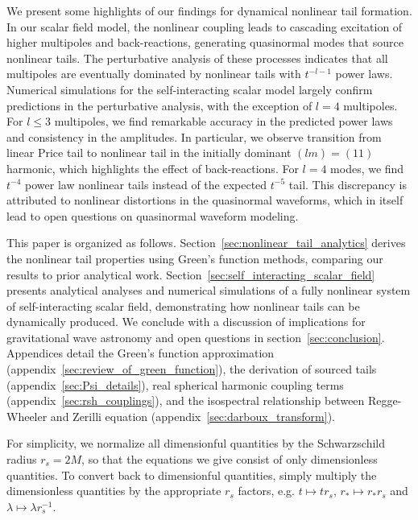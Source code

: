 \documentclass[reprint,aps,physrev,superscriptaddress,10pt,notitlepage,prd,nofootinbib,onecolumn]{revtex4-2}
\newcommand{\sref}[1]{section~\ref{#1}}
\newcommand{\Sref}[1]{Section~\ref{#1}}
\newcommand{\aref}[1]{appendix~\ref{#1}}
\begin{document}
We present some highlights of our findings for dynamical nonlinear tail formation.
In our scalar field model, the nonlinear coupling leads to cascading excitation of higher multipoles and back-reactions, generating quasinormal modes that source nonlinear tails.
The perturbative analysis of these processes indicates that all multipoles are eventually dominated by nonlinear tails with $t^{-l-1}$ power laws.
Numerical simulations for the self-interacting scalar model largely confirm predictions in the perturbative analysis, with the exception of $l=4$ multipoles.
For $l \leq 3$ multipoles, we find remarkable accuracy in the predicted power laws and consistency in the amplitudes.
In particular, we observe transition from linear Price tail to nonlinear tail in the initially dominant $(lm)=(11)$ harmonic, which highlights the effect of back-reactions.
For $l=4$ modes, we find $t^{-4}$ power law nonlinear tails instead of the expected $t^{-5}$ tail.
This discrepancy is attributed to nonlinear distortions in the quasinormal waveforms, which in itself lead to open questions on quasinormal waveform modeling.





This paper is organized as follows.
\Sref{sec:nonlinear_tail_analytics} derives the nonlinear tail properties using Green's function methods, comparing our results to prior analytical work.
\Sref{sec:self_interacting_scalar_field} presents analytical analyses and numerical simulations of a fully nonlinear system of self-interacting scalar field, demonstrating how nonlinear tails can be dynamically produced.
We conclude with a discussion of implications for gravitational wave astronomy and open questions in \sref{sec:conclusion}.
Appendices detail the Green's function approximation (\aref{sec:review_of_green_function}), the derivation of sourced tails (\aref{sec:Psi_details}), real spherical harmonic coupling terms (\aref{sec:rsh_couplings}), and the isospectral relationship between Regge-Wheeler and Zerilli equation (\aref{sec:darboux_transform}).



For simplicity, we normalize all dimensionful quantities by the Schwarzschild radius $r_s = 2M$, so that the equations we give consist of only dimensionless quantities.
To convert back to dimensionful quantities, simply multiply the dimensionless quantities by the appropriate $r_s$ factors, e.g. $t \mapsto t r_s$, $r_* \mapsto r_* r_s$ and $\lambda \mapsto \lambda r_s^{-1}$.
\end{document}
